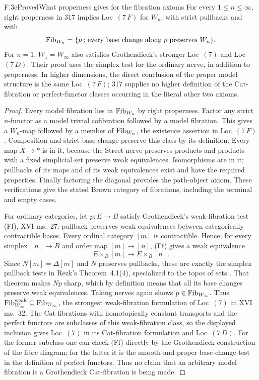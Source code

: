 \begin{claim}{F.3e}{Proved}{What properness gives for the fibration axioms}
For every $1\leq n\leq\infty$, right properness in 317 implies
Loc~$(7\,F)$ for $W_n$, with strict pullbacks and with
\[
 \operatorname{Fib}_{W_n}=
 \{p:\text{every base change along }p\text{ preserves }W_n\}.
\]
For $n=1$, $W_1=W_\infty$ also satisfies Grothendieck's stronger
Loc~$(7)$ and Loc~$(7\,D)$. Their proof uses the simplex test for
the ordinary nerve, in addition to properness. In higher dimensions,
the direct conclusion of the proper model structure is the same
Loc~$(7\,F)$; 317 supplies no higher definition of the Cat-fibration
or perfect-functor classes occurring in the literal other two axioms.
\end{claim}
\begin{proof}
Every model fibration lies in $\operatorname{Fib}_{W_n}$ by right properness.
Factor any strict $n$-functor as a model trivial cofibration
followed by a model fibration. This gives a $W_n$-map followed
by a member of $\operatorname{Fib}_{W_n}$, the existence assertion in
Loc~$(7\,F)$. Composition and strict base change preserve this
class by its definition. Every map $X\to *$ is in it, because
the Street nerve preserves products and products with a fixed
simplicial set preserve weak equivalences. Isomorphisms are in it;
pullbacks of its maps and of its weak equivalences exist and have
the required properties. Finally factoring the diagonal provides
the path-object axiom. These verifications give the stated Brown
category of fibrations, including the terminal and empty cases.

For ordinary categories, let $p:E\to B$ satisfy Grothendieck's
weak-fibration test (Ff), XVI ms.~27: pullback preserves weak
equivalences between categorically contractible bases. Every
ordinal category $[m]$ is contractible. Hence, for every simplex
$[n]\to B$ and order map $[m]\to[n]$, (Ff) gives a weak
equivalence
\[
 E\times_B[m]\longrightarrow E\times_B[n].
\]
Since $N[m]=\Delta[m]$ and $N$ preserves pullbacks, these are
exactly the simplex pullback tests in Rezk's Theorem~4.1(4),
specialized to the topos of sets \cite{I_Rezk1998}. That theorem
makes $Np$ sharp, which by definition means that all its base
changes preserve weak equivalences. Taking nerves again shows
$p\in\operatorname{Fib}_{W_\infty}$. Thus
$\mathrm{Fib}^{\mathrm{weak}}_{W_\infty}\subseteq
\operatorname{Fib}_{W_\infty}$, the strongest weak-fibration formulation of
Loc~$(7)$ at XVI ms.~32. The Cat-fibrations with homotopically
constant transports and the perfect functors are subclasses of
this weak-fibration class, so the displayed inclusion gives
Loc~$(7)$ in its Cat-fibration formulation and Loc~$(7\,D)$.
For the former subclass one can check (Ff) directly by the
Grothendieck construction of the fibre diagram; for the latter
it is the smooth-and-proper base-change test in the definition of
perfect functors. Thus no claim that an arbitrary model fibration
is a Grothendieck Cat-fibration is being made.


\end{proof}
